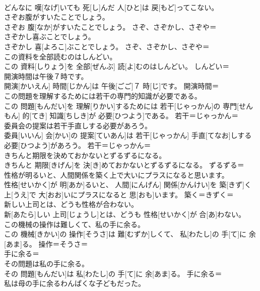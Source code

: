 \documentclass[8pt]{extreport}
\begin{document}
\begin{CJK}{UTF8}{min}
\\	どんなに 嘆[なげ]いても 死[し]んだ 人[ひと]は 戻[もど]ってこない。	
\\	さぞお腹がすいたことでしょう。	
\\	さぞお 腹[なか]がすいたことでしょう。	さぞ、さぞかし、さぞや＝ 
\\	さぞかし喜ぶことでしょう。	
\\	さぞかし 喜[よろこ]ぶことでしょう。	さぞ、さぞかし、さぞや＝ 
\\	この資料を全部読むのはしんどい。	
\\	この 資料[しりょう]を 全部[ぜんぶ] 読[よ]むのはしんどい。	しんどい＝ 
\\	開演時間は午後７時です。	
\\	開演[かいえん] 時間[じかん]は 午後[ごご]７ 時[じ]です。	開演時間＝ 
\\	この問題を理解するためには若干の専門的知識が必要である。	
\\	この 問題[もんだい]を 理解[りかい]するためには 若干[じゃっかん]の 専門[せんもん] 的[てき] 知識[ちしき]が 必要[ひつよう]である。	若干＝じゃっかん＝ 
\\	委員会の提案は若干手直しする必要があろう。	
\\	委員[いいん] 会[かい]の 提案[ていあん]は 若干[じゃっかん] 手直[てなお]しする 必要[ひつよう]があろう。	若干＝じゃっかん＝ 
\\	きちんと期限を決めておかないとずるずるになる。	
\\	きちんと 期限[きげん]を 決[き]めておかないとずるずるになる。	ずるずる＝ 
\\	性格が明るいと、人間関係を築く上で大いにプラスになると思います。	
\\	性格[せいかく]が 明[あか]るいと、 人間[にんげん] 関係[かんけい]を 築[きず]く 上[うえ]で 大[おお]いにプラスになると 思[おも]います。	築く＝きずく＝ 
\\	新しい上司とは、どうも性格が合わない。	
\\	新[あたら]しい 上司[じょうし]とは、どうも 性格[せいかく]が 合[あ]わない。	
\\	この機械の操作は難しくて、私の手に余る。	
\\	この 機械[きかい]の 操作[そうさ]は 難[むずか]しくて、 私[わたし]の 手[て]に 余[あま]る。	操作＝そうさ＝ 
\\	手に余る＝ 
\\	その問題は私の手に余る。	
\\	その 問題[もんだい]は 私[わたし]の 手[て]に 余[あま]る。	手に余る＝ 
\\	私は母の手に余るわんぱくな子どもだった。	

\end{CJK}
\end{document}
